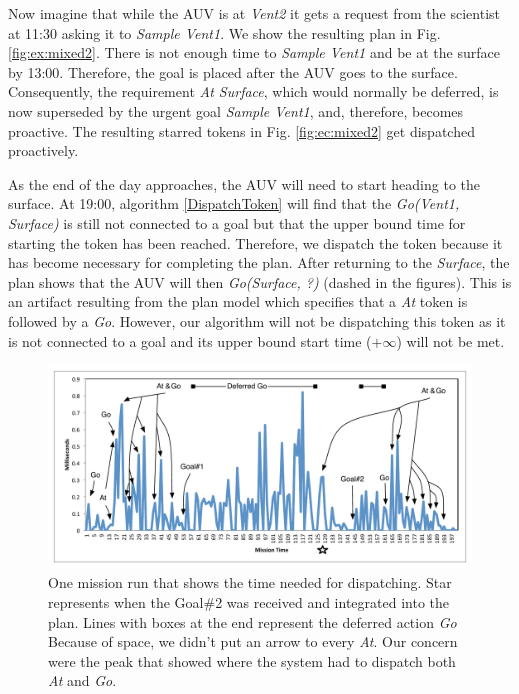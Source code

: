 Now imagine that while the AUV is at {\em Vent2} it gets a
request from the scientist at 11:30 asking it to {\em Sample Vent1}. We show the resulting plan in
Fig. \ref{fig:ex:mixed2}. There is not enough time to {\em Sample Vent1} and be at the surface by
13:00. Therefore, the goal is placed after the AUV goes to the surface.  Consequently, the requirement
{\em At Surface},  which would normally be deferred, is now superseded by the urgent goal {\em Sample Vent1},
and, therefore, becomes proactive. The resulting starred tokens in Fig. \ref{fig:ec:mixed2} get dispatched 
proactively.

As the end of the day approaches, the AUV will need to start heading
to the surface. At 19:00, algorithm \ref{DispatchToken} will find that the {\em Go(Vent1,
Surface)} is still not connected to a goal but that the upper bound time
for starting the token has been reached. Therefore, we dispatch
the token because it has become necessary for completing the plan.
After returning to the {\em Surface}, the plan shows that the AUV will then {\em
Go(Surface, ?)} (dashed in the figures). This is an artifact resulting
from the plan model which specifies that a {\em At} token is followed by a {\em Go}. 
However, our algorithm will not be dispatching this token as 
it is not connected to a goal and its upper bound start time
($+\infty$) will not be met.

\begin{figure}
\centering
\includegraphics[width=\columnwidth]{figs/example_run.pdf}
\caption{\small  One mission run that shows the time needed for dispatching. Star represents when the Goal\#2 was
received and integrated into the plan. Lines with boxes at the end represent the deferred action {\em Go} Because of space,
we didn't put an arrow to every {\em At}. Our concern were the peak that showed where the system had to dispatch both {\em At} and {\em Go}. } 
  \label{fig:example_run}
\end{figure}

